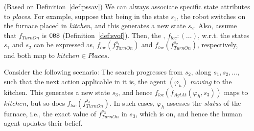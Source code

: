 \documentclass[letterpaper]{article} %
\begin{document}
(Based on Definition~\ref{def:pssav}) We can always associate specific state attributes to \textit{places}. 
For example, suppose that being in the state $s_1$, the robot switches on the furnace placed in \textit{kitchen}, and this generates a new state $s_2$. Also, assume that
$f_{\textit{TurnOn}}
$ is $\texttt{OBS}$ (Definition~\ref{def:svof}).   
Then, the , $f_{loc} : (...)$, w.r.t. the states
$s_1$ and 
$s_2$ can be expressed as, 
$f_{\textit{loc}} (f_{\textit{TurnOn}}^{s_1} )$ and $f_{\textit{loc}} (f_{\textit{TurnOn}}^{s_2} )$, respectively, and both map to $\textit{kitchen} \in Places$.

Consider the following scenario: The search progresses from $s_2$, along $s_1, s_2, ...$, such that the next action applicable in it is, the agent $(\varphi_h)$ \textit{moving} to the kitchen. This generates a new state $s_3$, and hence $f_{\textit{loc}} (f_{\textit{AgtAt}}(\varphi_h, s_3) )$ maps to $kitchen$, but so does  $f_{\textit{loc}} (f_{\textit{TurnOn}}^{s_3})$. 
In such cases, $\varphi_h$ assesses the \textit{status} of the furnace, i.e., the exact value of $f_{\textit{TurnOn}}^{s_3}$ in $s_3$, which is {\sc on}, and hence the human agent updates their belief.  


\end{document}
